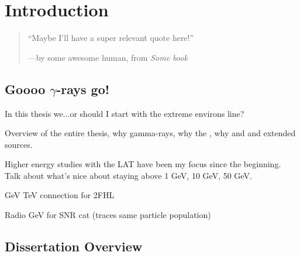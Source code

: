 \chapter{Introduction}
\label{chap:intro}

\begin{quote}
	``Maybe I'll have a super relevant quote here!'' 
	\begin{center}---by some awesome human, from \it{Some book} \end{center}
\end{quote}

\section{Goooo $\gamma$-rays go!}

In this thesis we...or should I start with the extreme environs line?

Overview of the entire thesis, why gamma-rays, why the \lat, why \snr and \pwn and extended sources.

Higher energy studies with the LAT have been my focus since the beginning. Talk about what's nice about staying above 1 GeV, 10 GeV, 50 GeV. 

GeV TeV connection for 2FHL

Radio GeV for SNR cat (traces same particle population)


\section{Dissertation Overview}